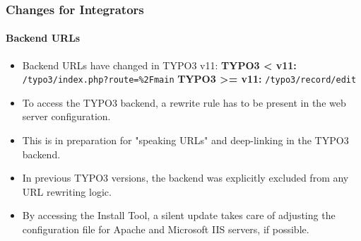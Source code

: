 %

\begin{frame}[fragile]
	\frametitle{Changes for Integrators}
	\framesubtitle{Backend URLs}

	\begin{itemize}
		\item Backend URLs have changed in TYPO3 v11:\newline
			\small\textbf{TYPO3 < v11:}\normalsize\newline
			\smaller\texttt{/typo3/index.php?route=\%2Fmain}\normalsize\newline
			\small\textbf{TYPO3 >= v11:}\normalsize\newline
			\smaller\texttt{/typo3/record/edit}\normalsize

		\item To access the TYPO3 backend, a rewrite rule has to be present in
			the web server configuration.
		\item This is in preparation for "speaking URLs" and deep-linking in the
			TYPO3 backend.
		\item In previous TYPO3 versions, the backend was explicitly excluded
			from any URL rewriting logic.
		\item By accessing the Install Tool, a silent update takes care of
			adjusting the configuration file for Apache and Microsoft IIS
			servers, if possible.

	\end{itemize}
\end{frame}

